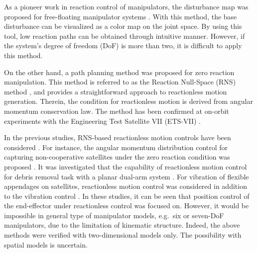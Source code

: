 \documentclass[preprint,12pt]{elsarticle}
\begin{document}
As a pioneer work in reaction control of manipulators,
the disturbance map was proposed
for free-floating manipulator systems \cite{Dubowsky1991,Dubowsky1993}.
With this method,
the base disturbance can be visualized as a color map on the joint space.
By using this tool,
low reaction paths can be obtained through intuitive manner.
However, if the system's degree of freedom (DoF) is more than two,
it is difficult to apply this method.

On the other hand,
a path planning method was proposed for zero reaction manipulation.
This method is referred to as the Reaction Null-Space (RNS) method \cite{Nenchev1992,Nenchev19992},
and provides a straightforward approach to reactionless motion generation.
Therein, the condition for reactionless motion is derived from angular momentum conservation law.
The method has been confirmed at on-orbit experiments with the Engineering Test Satellite VII
(ETS-VII) \cite{Yoshida2001,Yoshida2000}.

In the previous studies,
RNS-based reactionless motion controls have been considered \cite{Hirano2014,Oki2007,Nenchev1991}.
For instance, the angular momentum distribution control
for capturing non-cooperative satellites under the zero reaction condition was proposed \cite{Dimitrov2004}.
It was investigated that the capability of reactionless motion control for debris 
removal task with a planar dual-arm system \cite{Shah2013}.
For vibration of flexible appendages on satellites,
reactionless motion control was considered in addition to the vibration control \cite{Hirano2014}.
In these studies,
it can be seen that position control of the
end-effector under reactionless control was focused on.
However,
it would be impossible in general type of manipulator models, e.g.\ six or seven-DoF manipulators,
 due to the limitation of kinematic structure.
Indeed,
the above methods were verified with two-dimensional models only.
The possibility with spatial models is uncertain.
\end{document}
